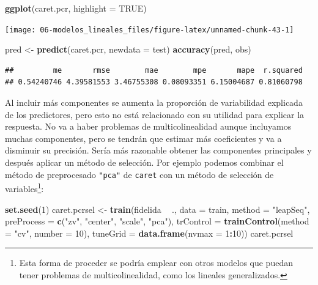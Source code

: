\documentclass[
]{book}
\newenvironment{Shaded}{\begin{snugshade}}{\end{snugshade}}
\newcommand{\DataTypeTok}[1]{\textcolor[rgb]{0.13,0.29,0.53}{#1}}
\newcommand{\DecValTok}[1]{\textcolor[rgb]{0.00,0.00,0.81}{#1}}
\newcommand{\KeywordTok}[1]{\textcolor[rgb]{0.13,0.29,0.53}{\textbf{#1}}}
\newcommand{\NormalTok}[1]{#1}
\newcommand{\OperatorTok}[1]{\textcolor[rgb]{0.81,0.36,0.00}{\textbf{#1}}}
\newcommand{\OtherTok}[1]{\textcolor[rgb]{0.56,0.35,0.01}{#1}}
\newcommand{\StringTok}[1]{\textcolor[rgb]{0.31,0.60,0.02}{#1}}
\theoremstyle{break}
\theoremstyle{definition}
\theoremstyle{definition}
\theoremstyle{definition}
\theoremstyle{remark}
\begin{document}
\begin{Shaded}
\begin{Highlighting}[]
\KeywordTok{ggplot}\NormalTok{(caret.pcr, }\DataTypeTok{highlight =} \OtherTok{TRUE}\NormalTok{)}
\end{Highlighting}
\end{Shaded}

\begin{center}\texttt{[image: 06-modelos\_lineales\_files/figure-latex/unnamed-chunk-43-1]} \end{center}

\begin{Shaded}
\begin{Highlighting}[]
\NormalTok{pred <-}\StringTok{ }\KeywordTok{predict}\NormalTok{(caret.pcr, }\DataTypeTok{newdata =}\NormalTok{ test)}
\KeywordTok{accuracy}\NormalTok{(pred, obs)}
\end{Highlighting}
\end{Shaded}

\begin{verbatim}
##         me       rmse        mae        mpe       mape  r.squared 
## 0.54240746 4.39581553 3.46755308 0.08093351 6.15004687 0.81060798
\end{verbatim}

Al incluir más componentes se aumenta la proporción de variabilidad explicada de los predictores,
pero esto no está relacionado con su utilidad para explicar la respuesta.
No va a haber problemas de multicolinealidad aunque incluyamos muchas componentes, pero se tendrán que estimar más coeficientes y va a disminuir su precisión.
Sería más razonable obtener las componentes principales y después aplicar un método de selección.
Por ejemplo podemos combinar el método de preprocesado \texttt{"pca"} de \texttt{caret} con un método de selección de variables\footnote{Esta forma de proceder se podría emplear con otros modelos que puedan tener problemas de multicolinealidad, como los lineales generalizados.}:

\begin{Shaded}
\begin{Highlighting}[]
\KeywordTok{set.seed}\NormalTok{(}\DecValTok{1}\NormalTok{)}
\NormalTok{caret.pcrsel <-}\StringTok{ }\KeywordTok{train}\NormalTok{(fidelida }\OperatorTok{~}\StringTok{ }\NormalTok{., }\DataTypeTok{data =}\NormalTok{ train, }\DataTypeTok{method =} \StringTok{"leapSeq"}\NormalTok{,}
                   \DataTypeTok{preProcess =} \KeywordTok{c}\NormalTok{(}\StringTok{"zv"}\NormalTok{, }\StringTok{"center"}\NormalTok{, }\StringTok{"scale"}\NormalTok{, }\StringTok{"pca"}\NormalTok{),     }
                   \DataTypeTok{trControl =} \KeywordTok{trainControl}\NormalTok{(}\DataTypeTok{method =} \StringTok{"cv"}\NormalTok{, }\DataTypeTok{number =} \DecValTok{10}\NormalTok{),}
                   \DataTypeTok{tuneGrid =} \KeywordTok{data.frame}\NormalTok{(}\DataTypeTok{nvmax =} \DecValTok{1}\OperatorTok{:}\DecValTok{10}\NormalTok{))}
\NormalTok{caret.pcrsel}
\end{Highlighting}
\end{Shaded}
\end{document}
